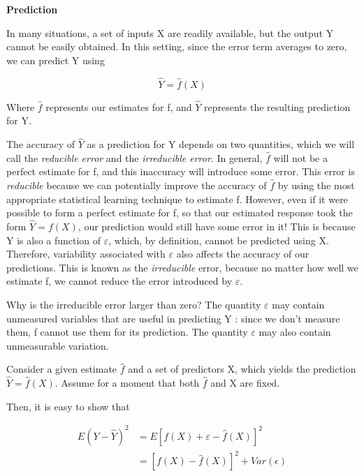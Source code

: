 \documentclass{article}
\theoremstyle{definition}
\theoremstyle{remark}
\begin{document}
\hspace{\fill}

\noindent\textbf{Prediction}

In many situations, a set of inputs X are readily available, but the output Y cannot be easily obtained. In this setting, since the error term averages to zero, we can predict Y using

\[
\hat{Y}=\hat{f}(X)
\]

Where $\hat{f}$ represents our estimates for f, and $\hat{Y}$ represents the resulting prediction for Y.

The accuracy of $\hat{Y}$ as a prediction for Y depends on two quantities, which we will call the \textit{reducible error} and the \textit{irreducible error}. In general, $\hat{f}$ will not be a perfect estimate for f, and this inaccuracy will introduce
some error. This error is \textit{reducible} because we can potentially improve the accuracy of $\hat{f}$ by using the most appropriate statistical learning technique to
estimate f. However, even if it were possible to form a perfect estimate for f, so that our estimated response took the form
$\hat{Y}=f(X)$, our prediction would still have some error in it!
This is because Y is also a function of $\varepsilon$, which, by definition, cannot be predicted using X. Therefore, variability associated with $\varepsilon$ also affects the accuracy of our predictions. This is known as the \textit{irreducible }error, because no matter how well we estimate f, we cannot reduce the error introduced by $\varepsilon$.

Why is the irreducible error larger than zero? The quantity $\varepsilon$ may contain
unmeasured variables that are useful in predicting Y : since we don’t
measure them, f cannot use them for its prediction. The quantity $\varepsilon$ may
also contain unmeasurable variation.

Consider a given estimate $\hat{f}$ and a set of predictors X, which yields the prediction $\hat{Y}=\hat{f}(X)$. Assume for a moment that both $\hat{f}$ and X are fixed.

Then, it is easy to show that

\begin{equation*}
	\begin{split}
		E(Y-\hat{Y})^2 &=E[f(X)+\varepsilon-\hat{f}(X)]^2\\
						&=[f(X)-\hat{f}(X)]^2+Var(\epsilon)
	\end{split}
\end{equation*}
\end{document}
